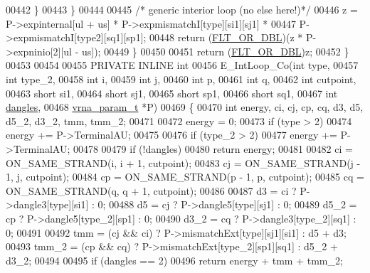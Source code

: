 \begin{DoxyCode}
00442       \}
00443     \}
00444 
00445     \textcolor{comment}{/* generic interior loop (no else here!)*/}
00446     z = P->expinternal[ul + us] * P->expmismatchI[type][si1][sj1] *
00447         P->expmismatchI[type2][sq1][sp1];
00448     \textcolor{keywordflow}{return} (\hyperlink{group__data__structures_ga31125aeace516926bf7f251f759b6126}{FLT\_OR\_DBL})(z * P->expninio[2][ul - us]);
00449   \}
00450 
00451   \textcolor{keywordflow}{return} (\hyperlink{group__data__structures_ga31125aeace516926bf7f251f759b6126}{FLT\_OR\_DBL})z;
00452 \}
00453 
00454 
00455 PRIVATE INLINE \textcolor{keywordtype}{int}
00456 E\_IntLoop\_Co(\textcolor{keywordtype}{int}          type,
00457              \textcolor{keywordtype}{int}          type\_2,
00458              \textcolor{keywordtype}{int}          i,
00459              \textcolor{keywordtype}{int}          j,
00460              \textcolor{keywordtype}{int}          p,
00461              \textcolor{keywordtype}{int}          q,
00462              \textcolor{keywordtype}{int}          cutpoint,
00463              \textcolor{keywordtype}{short}        si1,
00464              \textcolor{keywordtype}{short}        sj1,
00465              \textcolor{keywordtype}{short}        sp1,
00466              \textcolor{keywordtype}{short}        sq1,
00467              \textcolor{keywordtype}{int}          \hyperlink{group__model__details_ga72b511ed1201f7e23ec437e468790d74}{dangles},
00468              \hyperlink{group__energy__parameters_structvrna__param__s}{vrna\_param\_t} *P)
00469 \{
00470   \textcolor{keywordtype}{int} energy, ci, cj, cp, cq, d3, d5, d5\_2, d3\_2, tmm, tmm\_2;
00471 
00472   energy = 0;
00473   \textcolor{keywordflow}{if} (type > 2)
00474     energy += P->TerminalAU;
00475 
00476   \textcolor{keywordflow}{if} (type\_2 > 2)
00477     energy += P->TerminalAU;
00478 
00479   \textcolor{keywordflow}{if} (!dangles)
00480     \textcolor{keywordflow}{return} energy;
00481 
00482   ci  = ON\_SAME\_STRAND(i, i + 1, cutpoint);
00483   cj  = ON\_SAME\_STRAND(j - 1, j, cutpoint);
00484   cp  = ON\_SAME\_STRAND(p - 1, p, cutpoint);
00485   cq  = ON\_SAME\_STRAND(q, q + 1, cutpoint);
00486 
00487   d3    = ci  ? P->dangle3[type][si1]   : 0;
00488   d5    = cj  ? P->dangle5[type][sj1]   : 0;
00489   d5\_2  = cp  ? P->dangle5[type\_2][sp1] : 0;
00490   d3\_2  = cq  ? P->dangle3[type\_2][sq1] : 0;
00491 
00492   tmm   = (cj && ci) ? P->mismatchExt[type][sj1][si1]   : d5 + d3;
00493   tmm\_2 = (cp && cq) ? P->mismatchExt[type\_2][sp1][sq1] : d5\_2 + d3\_2;
00494 
00495   \textcolor{keywordflow}{if} (dangles == 2)
00496     \textcolor{keywordflow}{return} energy + tmm + tmm\_2;

\end{DoxyCode}
